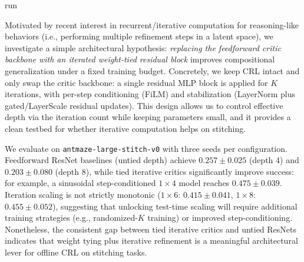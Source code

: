 run\documentclass[11pt]{article}
\begin{document}
Motivated by recent interest in recurrent/iterative computation for reasoning-like behaviors (i.e., performing multiple refinement steps in a latent space), we investigate a simple architectural hypothesis: \emph{replacing the feedforward critic backbone with an iterated weight-tied residual block} improves compositional generalization under a fixed training budget. Concretely, we keep CRL intact and only swap the critic backbone: a single residual MLP block is applied for $K$ iterations, with per-step conditioning (FiLM) and stabilization (LayerNorm plus gated/LayerScale residual updates). This design allows us to control effective depth via the iteration count while keeping parameters small, and it provides a clean testbed for whether iterative computation helps on stitching.

We evaluate on \texttt{antmaze-large-stitch-v0} with three seeds per configuration. Feedforward ResNet baselines (untied depth) achieve $0.257 \pm 0.025$ (depth 4) and $0.203 \pm 0.080$ (depth 8), while tied iterative critics significantly improve success: for example, a sinusoidal step-conditioned $1\times4$ model reaches $0.475 \pm 0.039$. Iteration scaling is not strictly monotonic ($1\times6$: $0.415 \pm 0.041$, $1\times8$: $0.455 \pm 0.052$), suggesting that unlocking test-time scaling will require additional training strategies (e.g., randomized-$K$ training) or improved step-conditioning. Nonetheless, the consistent gap between tied iterative critics and untied ResNets indicates that weight tying plus iterative refinement is a meaningful architectural lever for offline CRL on stitching tasks. \par
\end{document}
